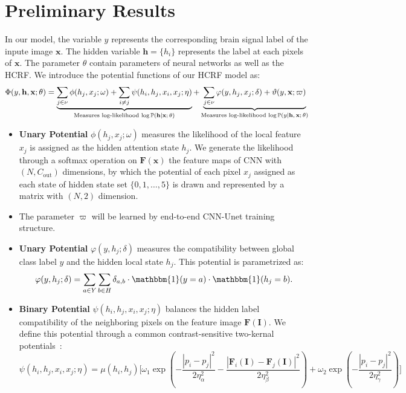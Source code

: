\documentclass[10pt]{article}
\newcommand{\PP}{{\mathbb{P}}}
\newcommand{\Fb}{\mathbf{F}}
\newcommand{\Ib}{\mathbf{I}}
\newcommand{\hb}{\mathbf{h}}
\newcommand{\xb}{\mathbf{x}}
\newcommand{\one}{\mathbbm{1}}
\begin{document}
\section{Preliminary Results}

In our model, the variable \(y \) represents the corresponding brain signal label of the inpute image \(\mathbf{x}\). 
The hidden variable \(\mathbf{h} = \{h_{i}\}\) represents the label at each pixels of \(\mathbf{x}\). The parameter \(\theta\)
contain parameters of neural networks as well as the HCRF.
We introduce the potential functions of our HCRF model as:
\begin{equation*}
\Phi(y, \hb, \xb; \theta) = \underbrace{
\sum_{j \in \nu} \phi(h_j, x_j; \omega) +
\sum_{i \neq j} \psi(h_i, h_j, x_i, x_j; \eta)}_{
\textrm{Measures log-likelihood $\log\PP(\hb \vert \xb; \theta)$}}
+ \underbrace{
\sum_{j \in \nu} \varphi(y, h_j, x_j; \delta) + \vartheta(y, \xb; \varpi)
}_{
\textrm{Measures log-likelihood $\log\PP(y \vert \hb, \xb; \theta)$}
}
\end{equation*}


\begin{itemize}
\item \textbf{Unary Potential}
$\phi(h_j, x_j; \omega)$ measures the likelihood of the local feature
$x_j$ is assigned as the hidden attention state $h_j$.
We generate the likelihood through a softmax operation on $\Fb(\xb)$
the feature maps of CNN with $(N, C_{\textrm{out}})$ dimensions,
by which the potential of each pixel $x_j$ assigned as each state of
hidden state set $\{0, 1, \dots, 5\}$
is drawn and represented by a matrix with $(N, 2)$ dimension.
\item The parameter $\varpi$ will be learned by end-to-end CNN-Unet
training structure.
\item \textbf{Unary Potential} $\varphi(y, h_j; \delta)$ measures
the compatibility between global class label $y$ and the hidden local
state $h_j$. This potential is parametrized as:
\begin{align*}
\varphi(y, h_{j}; \delta) = \sum_{a \in Y} \sum_{b \in H} \delta_{a, b}
\cdot \one(y = a) \cdot \one(h_j = b).
\end{align*}
\item \textbf{Binary Potential} $\psi(h_i, h_j, x_i, x_j; \eta)$
balances the hidden label compatibility of the neighboring pixels on the 
feature image $\Fb(\Ib)$.
We define this potential through a common contrast-sensitive two-kernal 
potentials~\citep{krahenbuhl2011efficient,chen2022end}:
\begin{equation*}
\psi(h_i, h_j, x_i, x_j; \eta) = \mu(h_i, h_j) \Bigg[
\omega_1 \exp \left(
-\frac{\left\lvert p_i - p_j \right\rvert^2}{2\eta_\alpha^2}
-\frac{\left\lvert \Fb_i(\Ib) - \Fb_j(\Ib) \right\rvert^2}{2\eta_\beta^2} 
\right) + \omega_2 \exp \left(
- \frac{\left\lvert p_i - p_j \right\rvert^2}{2 \eta_\gamma^2}
\right)
\Bigg]
\end{equation*}
\end{itemize}
\end{document}
